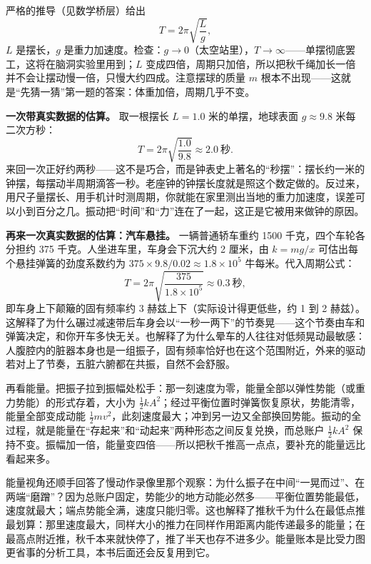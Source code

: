 严格的推导（见数学桥层）给出
\[
  T=2\pi\sqrt{\frac{L}{g}},
\]
\(L\) 是摆长，\(g\) 是重力加速度。检查：\(g\to 0\)（太空站里），\(T\to\infty\)——单摆彻底罢工，这将在脑洞实验里用到；\(L\) 变成四倍，周期只加倍，所以把秋千绳加长一倍并不会让摆动慢一倍，只慢大约四成。注意摆球的质量 \(m\) 根本不出现——这就是“先猜一猜”第一题的答案：体重加倍，周期几乎不变。

\textbf{一次带真实数据的估算。} 取一根摆长 \(L=1.0\) 米的单摆，地球表面 \(g\approx9.8\) 米每二次方秒：
\[
  T=2\pi\sqrt{\frac{1.0}{9.8}}\approx 2.0\ \text{秒}.
\]
来回一次正好约两秒——这不是巧合，而是钟表史上著名的“秒摆”：摆长约一米的钟摆，每摆动半周期滴答一秒。老座钟的钟摆长度就是照这个数定做的。反过来，用尺子量摆长、用手机计时测周期，你就能在家里测出当地的重力加速度，误差可以小到百分之几。振动把“时间”和“力”连在了一起，这正是它被用来做钟的原因。

\textbf{再来一次真实数据的估算：汽车悬挂。} 一辆普通轿车重约 1500 千克，四个车轮各分担约 375 千克。人坐进车里，车身会下沉大约 2 厘米，由 \(k=mg/x\) 可估出每个悬挂弹簧的劲度系数约为 \(375\times9.8/0.02\approx1.8\times10^{5}\) 牛每米。代入周期公式：
\[
  T=2\pi\sqrt{\frac{375}{1.8\times10^{5}}}\approx 0.3\ \text{秒},
\]
即车身上下颠簸的固有频率约 3 赫兹上下（实际设计得更低些，约 1 到 2 赫兹）。这解释了为什么碾过减速带后车身会以“一秒一两下”的节奏晃——这个节奏由车和弹簧决定，和你开车多快无关。也解释了为什么晕车的人往往对低频晃动最敏感：人腹腔内的脏器本身也是一组振子，固有频率恰好也在这个范围附近，外来的驱动若对上了节奏，五脏六腑都在共振，自然不会舒服。

再看能量。把振子拉到振幅处松手：那一刻速度为零，能量全部以弹性势能（或重力势能）的形式存着，大小为 \(\frac12 kA^{2}\)；经过平衡位置时弹簧恢复原状，势能清零，能量全部变成动能 \(\frac12 mv^{2}\)，此刻速度最大；冲到另一边又全部换回势能。振动的全过程，就是能量在“存起来”和“动起来”两种形态之间反复兑换，而总账户 \(\frac12 kA^{2}\) 保持不变。振幅加一倍，能量变四倍——所以把秋千推高一点点，要补充的能量远比看起来多。

能量视角还顺手回答了慢动作录像里那个观察：为什么振子在中间“一晃而过”、在两端“磨蹭”？因为总账户固定，势能少的地方动能必然多——平衡位置势能最低，速度就最大；端点势能全满，速度只能归零。这也解释了推秋千为什么在最低点推最划算：那里速度最大，同样大小的推力在同样作用距离内能传递最多的能量；在最高点附近推，秋千本来就快停了，推了半天也存不进多少。能量账本是比受力图更省事的分析工具，本书后面还会反复用到它。


